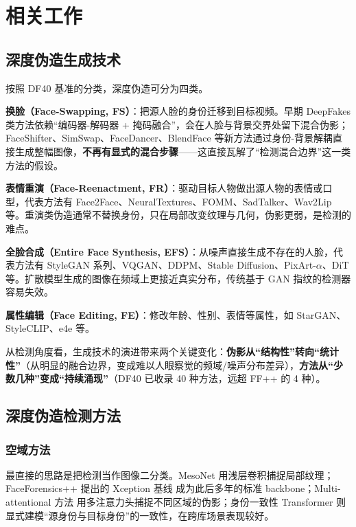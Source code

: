 \section{相关工作}

\subsection{深度伪造生成技术}

按照 DF40 基准的分类\cite{yan2024df40}，深度伪造可分为四类。

\textbf{换脸（Face-Swapping, FS）}：把源人脸的身份迁移到目标视频。早期 DeepFakes 类方法依赖“编码器-解码器 + 掩码融合”，会在人脸与背景交界处留下混合伪影；FaceShifter\cite{li2020faceshifter}、SimSwap、FaceDancer、BlendFace 等新方法通过身份-背景解耦直接生成整幅图像，\textbf{不再有显式的混合步骤}——这直接瓦解了“检测混合边界”这一类方法的假设。

\textbf{表情重演（Face-Reenactment, FR）}：驱动目标人物做出源人物的表情或口型，代表方法有 Face2Face\cite{thies2016face2face}、NeuralTextures\cite{thies2019neural}、FOMM、SadTalker、Wav2Lip 等。重演类伪造通常不替换身份，只在局部改变纹理与几何，伪影更弱，是检测的难点。

\textbf{全脸合成（Entire Face Synthesis, EFS）}：从噪声直接生成不存在的人脸，代表方法有 StyleGAN 系列、VQGAN、DDPM\cite{ho2020ddpm}、Stable Diffusion\cite{rombach2022ldm}、PixArt-$\alpha$、DiT 等。扩散模型生成的图像在频域上更接近真实分布，传统基于 GAN 指纹的检测器容易失效。

\textbf{属性编辑（Face Editing, FE）}：修改年龄、性别、表情等属性，如 StarGAN、StyleCLIP、e4e 等。

从检测角度看，生成技术的演进带来两个关键变化：\textbf{伪影从“结构性”转向“统计性”}（从明显的融合边界，变成难以人眼察觉的频域/噪声分布差异），\textbf{方法从“少数几种”变成“持续涌现”}（DF40 已收录 40 种方法，远超 FF++ 的 4 种）。

\subsection{深度伪造检测方法}

\subsubsection{空域方法}

最直接的思路是把检测当作图像二分类。MesoNet\cite{afchar2018mesonet} 用浅层卷积捕捉局部纹理；FaceForensics++ 提出的 Xception 基线\cite{rossler2019ffpp} 成为此后多年的标准 backbone；Multi-attentional 方法\cite{zhao2021multi} 用多注意力头捕捉不同区域的伪影；身份一致性 Transformer\cite{dong2022ict} 则显式建模“源身份与目标身份”的一致性，在跨库场景表现较好。

